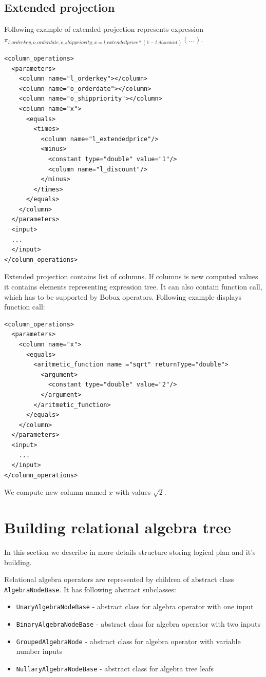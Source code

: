 \subsection{Extended projection}
Following example of extended projection represents expression \\ $\pi_{l\_orderkey,o\_orderdate,o\_shippriority,x=l\_extendedprice*(1-l\_discount)}(...)$.
\begin{lstlisting}
<column_operations>
  <parameters>
    <column name="l_orderkey"></column>
    <column name="o_orderdate"></column>
    <column name="o_shippriority"></column>
    <column name="x">
      <equals>
        <times>
          <column name="l_extendedprice"/>
          <minus>
            <constant type="double" value="1"/>
            <column name="l_discount"/>
          </minus>
        </times>
      </equals>
    </column>
  </parameters>
  <input>
  ...
  </input>
</column_operations>
\end{lstlisting}

Extended projection contains list of columns. If columns is new computed values it contains elements representing expression tree. It can also contain function call, which has to be supported by Bobox operators. Following example displays function call:


\begin{lstlisting}
<column_operations>
  <parameters>
    <column name="x">
      <equals>
        <aritmetic_function name ="sqrt" returnType="double">
          <argument>
            <constant type="double" value="2"/>
          </argument>
        </aritmetic_function>
      </equals>
    </column>
  </parameters>
  <input>
    ...
  </input>
</column_operations>
\end{lstlisting}
 
 We compute new column named $x$ with values $\sqrt{2}$.
 
\section{Building relational algebra tree} 

In this section we describe in more details structure storing logical plan and it's building.

Relational algebra operators are represented by children of abstract class \texttt{AlgebraNodeBase}. It has following abstract subclasses:
\begin{itemize}

\item \texttt{UnaryAlgebraNodeBase} - abstract class for algebra operator with one input

\item \texttt{BinaryAlgebraNodeBase}  - abstract class for algebra operator with two inputs

\item \texttt{GroupedAlgebraNode} - abstract class for algebra operator with variable number inputs

\item \texttt{NullaryAlgebraNodeBase} -  abstract class for algebra tree leafs

\end{itemize}

